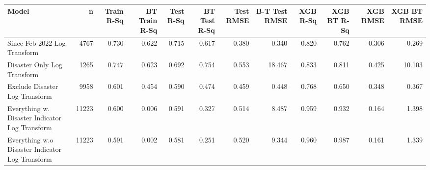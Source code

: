
\begin{tabular}{l|r|r|r|r|r|r|r|r|r|r|r}
\hline
Model & n & Train R-Sq & BT Train R-Sq & Test R-Sq & BT Test R-Sq & Test RMSE & B-T Test RMSE & XGB R-Sq & XGB BT R-Sq & XGB RMSE & XGB BT RMSE\\
\hline
Since Feb 2022 Log Transform & 4767 & 0.730 & 0.622 & 0.715 & 0.617 & 0.380 & 0.340 & 0.820 & 0.762 & 0.306 & 0.269\\
\hline
Disaster Only Log Transform & 1265 & 0.747 & 0.623 & 0.692 & 0.754 & 0.553 & 18.467 & 0.833 & 0.811 & 0.425 & 10.103\\
\hline
Exclude Disaster Log Transform & 9958 & 0.601 & 0.454 & 0.590 & 0.474 & 0.459 & 0.448 & 0.768 & 0.650 & 0.348 & 0.367\\
\hline
Everything w. Disaster Indicator Log Transform & 11223 & 0.600 & 0.006 & 0.591 & 0.327 & 0.514 & 8.487 & 0.959 & 0.932 & 0.164 & 1.398\\
\hline
Everything w.o Disaster Indicator Log Transform & 11223 & 0.591 & 0.002 & 0.581 & 0.251 & 0.520 & 9.344 & 0.960 & 0.987 & 0.161 & 1.339\\
\hline
\end{tabular}
